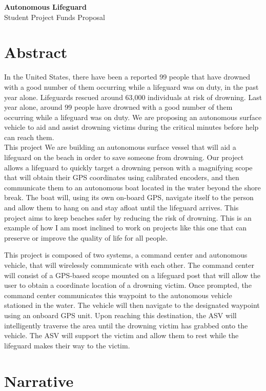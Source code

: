 \documentclass[11pt]{article}
\begin{document}
\begin{center} 
{
    {\Large \textbf{Autonomous Lifeguard}}\\
  	{\large Student Project Funds Proposal}
}
\end{center}

\section*{Abstract}
In the United States, there have been a reported 99 people that have drowned with a good number of them occurring while a lifeguard was on duty, in the past year alone. Lifeguards rescued around 63,000 individuals at risk of drowning. Last year alone, around 99 people have drowned with a good number of them occurring while a lifeguard was on duty. We are proposing an autonomous surface vehicle to aid and assist drowning victims during the critical minutes before help can reach them.\\


This project We are building an autonomous surface vessel that will aid a lifeguard on the beach in order to save someone from drowning. Our project allows a lifeguard to quickly target a drowning person with a magnifying scope that will obtain their GPS coordinates using calibrated encoders, and then communicate them to an autonomous boat located in the water beyond the shore break. The boat will, using its own on-board GPS, navigate itself to the person and allow them to hang on and stay afloat until the lifeguard arrives. This project aims to keep beaches safer by reducing the risk of drowning. This is an example of how I am most inclined to work on projects like this one that can preserve or improve the quality of life for all people.

This project is composed of two systems, a command center and autonomous vehicle, that will wirelessly communicate with each other. The command center will consist of a GPS-based scope mounted on a lifeguard post that will allow the user to obtain a coordinate location of a drowning victim. Once prompted, the command center communicates this waypoint to the autonomous vehicle stationed in the water. The vehicle will then navigate to the designated waypoint using an onboard GPS unit. Upon reaching this destination, the ASV will intelligently traverse the area until the drowning victim has grabbed onto the vehicle. The ASV will support the victim and allow them to rest while the lifeguard makes their way to the victim.

\section*{Narrative}
\end{document}
